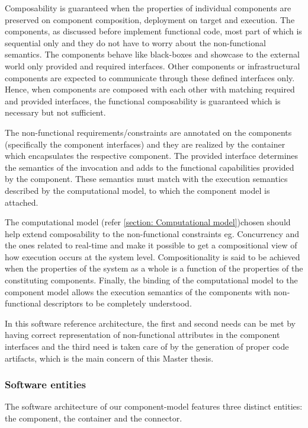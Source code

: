 \begin{description}
Composability is guaranteed when the properties of individual components are preserved on component composition, deployment on target and execution. The components, as discussed before implement functional code, most part of which is sequential only and they do not have to worry about the non-functional semantics. The components behave like black-boxes and showcase to the external world only provided and required interfaces. Other components or infrastructural components are expected to communicate through these defined interfaces only. Hence, when components are composed with each other with matching required and provided interfaces, the functional composability is guaranteed which is necessary but not sufficient.

The non-functional requirements/constraints are annotated on the components (specifically the component interfaces) and they are realized by the container which encapsulates the respective component. The provided interface determines the semantics of the invocation and adds to the functional capabilities provided by the component. These semantics must match with the execution semantics described by the computational model, to which the component model is attached.

The computational model (refer \cref{section: Computational model})chosen should help extend composability to the non-functional constraints eg. Concurrency and the ones related to real-time and make it possible to get a compositional view of how execution occurs at the system level. Compositionality is said to be achieved when the properties of the system as a whole is a function of the properties of the constituting components. Finally, the binding of the computational model to the component model allows the execution semantics of the components with non-functional descriptors to be completely understood.

In this software reference architecture, the first and second needs can be met by having correct representation of non-functional attributes in the component interfaces and the third need is taken care of by the generation of proper code artifacts, which is the main concern of this Master thesis.     
\end{description}

\subsubsection{Software entities}
\label {section: Software entities}
The software architecture of our component-model features three distinct entities: the component, the container and the connector.


